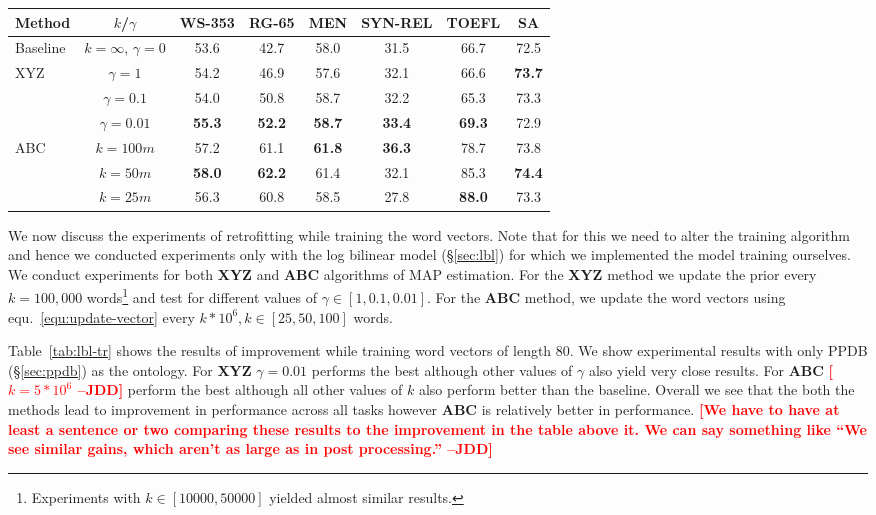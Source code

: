 \documentclass[11pt]{article}
\newcommand{\jdd}[1]{\textcolor{red}{\bf\small [#1 --JDD]}}
\begin{document}
\begin{table*}[!tbh]
  \centering
  \small
  \begin{tabular}{l|c||c|c|c||c|c||c}
Method & $k$/$\gamma$ & WS-353 & RG-65 & MEN & SYN-REL & TOEFL & SA \\
\hline
Baseline & $k=\infty$, $\gamma=0$ & 53.6 & 42.7 & 58.0 & 31.5 & 66.7 & 72.5 \\
\hline
\multirow{3}{*}{XYZ} & $\gamma=1$ & 54.2 & 46.9 & 57.6 & 32.1 & 66.6 & \textbf{73.7}\\
 & $\gamma=0.1$ & 54.0 & 50.8 & 58.7 & 32.2 & 65.3 & 73.3\\
 & $\gamma=0.01$ & \textbf{55.3} & \textbf{52.2} & \textbf{58.7} & \textbf{33.4} & \textbf{69.3} & 72.9\\
\hline\hline
\multirow{3}{*}{ABC} & $k=100m$ & 57.2 & 61.1 & \textbf{61.8} & \textbf{36.3} & 78.7 & 73.8\\
 & $k=50m$ & \textbf{58.0} & \textbf{62.2} & 61.4 & 32.1 & 85.3 & \textbf{74.4} \\
 & $k=25m$ & 56.3 & 60.8 & 58.5 & 27.8 & \textbf{88.0} & 73.3\\
\end{tabular}
   \caption{%
   Spearman's correlation (3 left columns) and accuracy (3 right columns) on different tasks. Bold indicates 
   best result across all vector types.}
  \label{tab:lbl-tr}
\end{table*}

We now discuss the experiments of retrofitting while training the word vectors. Note that
for this we need to alter the training algorithm and hence we conducted experiments only
with the log bilinear model (\S\ref{sec:lbl}) for which we implemented the model training ourselves.
We conduct experiments for both \textbf{XYZ} and \textbf{ABC} algorithms of
MAP estimation. For the \textbf{XYZ} method
we update the prior every $k=100,000$ words\footnote{Experiments with $k \in [10000, 50000]$ 
yielded almost similar results.} and test for different values of $\gamma \in [1, 0.1, 0.01]$.
For the \textbf{ABC} method, we update the word vectors using equ.~\ref{equ:update-vector}
every $k*10^6, k \in [25, 50, 100]$ words. 

Table~\ref{tab:lbl-tr} shows the results of improvement while training word vectors of length $80$. 
We show experimental results 
with only PPDB (\S\ref{sec:ppdb}) as the ontology. For \textbf{XYZ}
$\gamma = 0.01$ performs the best although other values of $\gamma$ also yield very close 
results. For \textbf{ABC} \jdd{$k=5*10^6$} perform the best although all other values of $k$
also perform better than the baseline. Overall we see that the both the methods lead to 
improvement in performance across all tasks however \textbf{ABC} is relatively better in
performance. \jdd{We have to have at least a sentence or two comparing these results to the improvement in the table above it. We can say something like ``We see similar gains, which aren't as large as in post processing.''}
\end{document}
